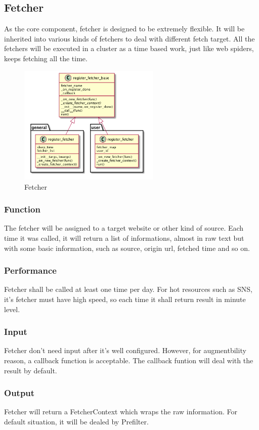 
\subsection{Fetcher}
  As the core component, fetcher is designed to be extremely flexible.
  It will be inherited into various kinds of fetchers to deal with different fetch target.
  All the fetchers will be executed in a cluster as a time based work, just like web spiders, keeps fetching all the time.
  \begin{figure}[H]
    \centering
    \includegraphics[width=0.6\textwidth]{img/fetcher.png}
    \caption{Fetcher\label{fig:fetcher}}
  \end{figure}

  \subsubsection{Function}
    The fetcher will be assigned to a target website or other kind of source.
    Each time it was called, it will return a list of informations, almost in raw text but with some basic information,
    such as source, origin url, fetched time and so on.

  \subsubsection{Performance}
    Fetcher shall be called at least one time per day. For hot resources such as SNS, it's fetcher must have high speed,
    so each time it shall return result in minute level.

  \subsubsection{Input}
    Fetcher don't need input after it's well configured. However, for augmentbility reason, a callback function is acceptable.
    The callback funtion will deal with the result by default.

  \subsubsection{Output}
    Fetcher will return a FetcherContext which wraps the raw information. For default situation, it will be dealed by Prefilter.

